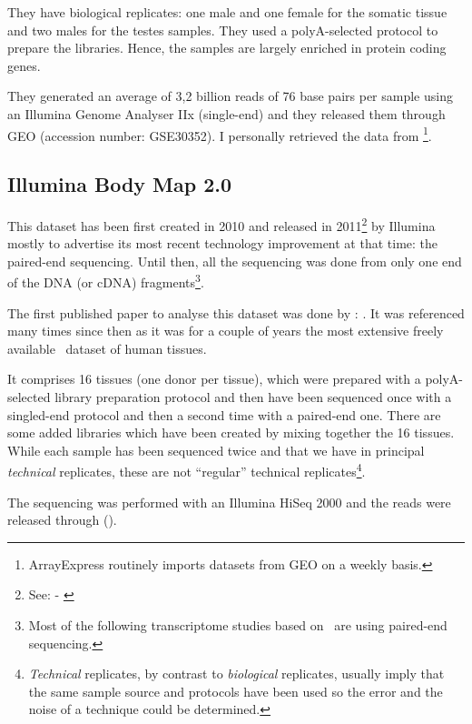 They have biological replicates: one male
and one female for the somatic tissue and two males for the testes samples.
They used a
polyA-selected protocol to prepare the libraries. Hence, the samples are largely
enriched in protein coding genes.

They generated an average of 3,2 billion reads of 76 base pairs per sample
using an Illumina Genome Analyser IIx (single-end) and they released them
through \gls{GEO} (accession number: GSE30352).
I personally retrieved the data from
\footnote{ArrayExpress routinely imports
datasets from \gls{GEO} on a weekly basis.}.

\subsection{Illumina Body Map 2.0}

This dataset has been first created in 2010 and released in
2011\footnote{See:  - \cite{ibmEnsembl}} by Illumina
mostly to advertise its most recent technology improvement at that time:
the paired-end sequencing.
Until then, all the sequencing was done from only one end of the \gls{DNA} (or
\gls{cDNA}) fragments\footnote{Most of the following transcriptome
studies based on \Rnaseq\ are using paired-end sequencing.}.

The first published paper to analyse this dataset was done by
\citet{ibmrelatedpaper}: .
It was referenced many times since then as it was for a couple of years
the most extensive freely available \Rnaseq\ dataset of human tissues.

It comprises 16 tissues (one donor per tissue), which were prepared with a
polyA-selected library preparation protocol and then have been sequenced once
with a singled-end protocol and then a second time with a paired-end one. There
are some added libraries which have been created by mixing together the 16 tissues.
While each sample has been sequenced twice and that we have in principal
\emph{technical} replicates, these are not ``regular'' technical
replicates\footnote{\emph{Technical} replicates,
by contrast to \emph{biological} replicates,
usually imply that the same sample source and protocols have been used so the
error and the noise of a technique could be determined.}.

The sequencing was performed with an Illumina HiSeq 2000 and the reads were
released through  ().


